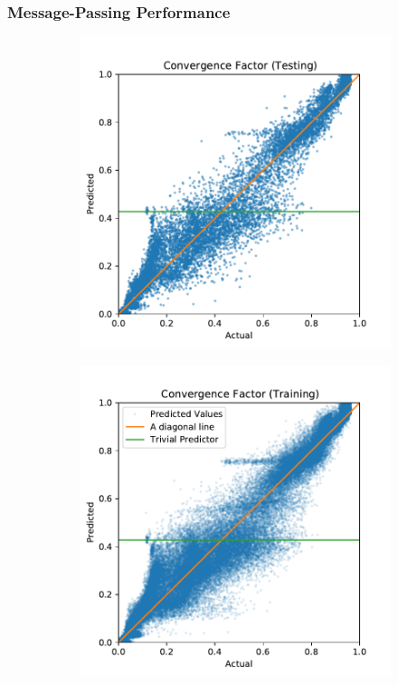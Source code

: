 \documentclass[handout]{beamer}
\begin{document}
\begin{frame}
  \frametitle{Message-Passing Performance}
  \begin{figure}[h]
  \centering
  \begin{subfigure}{.48\textwidth}
    \includegraphics[width=\textwidth]{figures/gnn_test.pdf}
    \label{subfig:cd_mpnn_test}
  \end{subfigure}
  \begin{subfigure}{.48\textwidth}
    \includegraphics[width=\textwidth]{figures/gnn_train.pdf}
    \label{subfig:cd_mpnn_train}
  \end{subfigure}
  \label{fig:cd_mpnn_pred}
\end{figure}
\end{frame}
\end{document}
